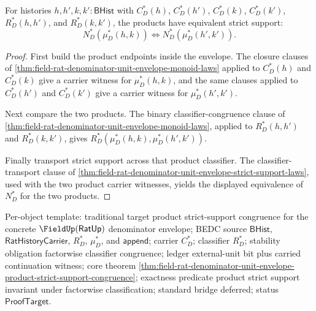 \begin{theorem}
\label{thm:field-rat-denominator-unit-envelope-product-strict-support-congruence}
For histories $h,h',k,k':\mathsf{BHist}$ with $C_D^\ast(h)$,
$C_D^\ast(h')$, $C_D^\ast(k)$, $C_D^\ast(k')$,
$R_D^\ast(h,h')$, and $R_D^\ast(k,k')$, the products have equivalent
strict support:
$$
N_D^\ast(\mu_D^\ast(h,k))\Longleftrightarrow
N_D^\ast(\mu_D^\ast(h',k')).
$$
\end{theorem}
\begin{proof}
First build the product endpoints inside the envelope. The closure clauses of
\autoref{thm:field-rat-denominator-unit-envelope-monoid-laws} applied to
$C_D^\ast(h)$ and $C_D^\ast(k)$ give a carrier witness for
$\mu_D^\ast(h,k)$, and the same clauses applied to $C_D^\ast(h')$ and
$C_D^\ast(k')$ give a carrier witness for $\mu_D^\ast(h',k')$.

Next compare the two products. The binary classifier-congruence clause of
\autoref{thm:field-rat-denominator-unit-envelope-monoid-laws}, applied to
$R_D^\ast(h,h')$ and $R_D^\ast(k,k')$, gives
$R_D^\ast(\mu_D^\ast(h,k),\mu_D^\ast(h',k'))$.

Finally transport strict support across that product classifier. The
classifier-transport clause of
\autoref{thm:field-rat-denominator-unit-envelope-strict-support-laws}, used
with the two product carrier witnesses, yields the displayed equivalence of
$N_D^\ast$ for the two products.
\end{proof}

Per-object template: traditional target product strict-support congruence for
the concrete $\FieldUp(\mathsf{RatUp})$ denominator envelope; BEDC source
$\mathsf{BHist}$, $\mathsf{RatHistoryCarrier}$, $R_D^\ast$, $\mu_D^\ast$, and
$\mathsf{append}$; carrier $C_D^\ast$; classifier $R_D^\ast$; stability
obligation factorwise classifier congruence; ledger external-unit bit plus
carried continuation witness; core theorem
\autoref{thm:field-rat-denominator-unit-envelope-product-strict-support-congruence};
exactness predicate product strict support invariant under factorwise
classification; standard bridge deferred; status $\mathsf{ProofTarget}$.

